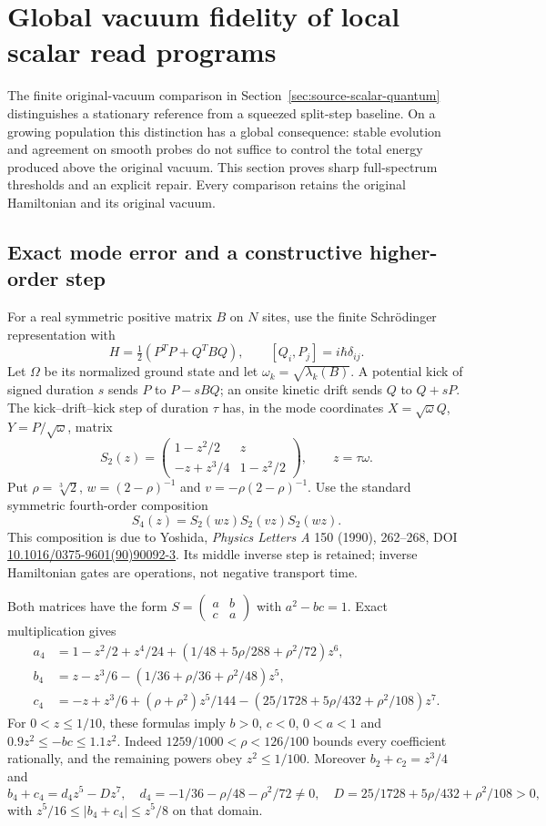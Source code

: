\section{Global vacuum fidelity of local scalar read programs}
\label{sec:m1-vacuum-fidelity}

The finite original-vacuum comparison in
Section~\ref{sec:source-scalar-quantum} distinguishes a stationary reference
from a squeezed split-step baseline. On a growing population this distinction
has a global consequence: stable evolution and agreement on smooth probes do
not suffice to control the total energy produced above the original vacuum.
This section proves sharp full-spectrum thresholds and an explicit repair.
Every comparison retains the original Hamiltonian and its original vacuum.

\subsection{Exact mode error and a constructive higher-order step}

For a real symmetric positive matrix $B$ on $N$ sites, use the finite
Schr\"odinger representation with
\[
 H=\tfrac12(P^TP+Q^TBQ),\qquad [Q_i,P_j]=i\hbar\delta_{ij}.
\]
Let $\Omega$ be its normalized ground state and let
$\omega_k=\sqrt{\lambda_k(B)}$. A potential kick of signed duration $s$
sends $P$ to $P-sBQ$; an onsite kinetic drift sends $Q$ to $Q+sP$.
The kick--drift--kick step of duration $\tau$ has, in the mode coordinates
$X=\sqrt\omega Q$, $Y=P/\sqrt\omega$, matrix
\[
 S_2(z)=\begin{pmatrix}1-z^2/2&z\\-z+z^3/4&1-z^2/2\end{pmatrix},
 \qquad z=\tau\omega.
\]
Put $\rho=\sqrt[3]{2}$, $w=(2-\rho)^{-1}$ and $v=-\rho(2-\rho)^{-1}$. Use the
standard symmetric fourth-order composition
\[
 S_4(z)=S_2(wz)S_2(vz)S_2(wz).
\]
This composition is due to Yoshida, \emph{Physics Letters A} 150 (1990),
262--268, DOI \href{https://doi.org/10.1016/0375-9601(90)90092-3}
{10.1016/0375-9601(90)90092-3}. Its middle inverse step is retained;
inverse Hamiltonian gates are operations, not negative transport time.

Both matrices have the form $S=\left(\begin{smallmatrix}a&b\\c&a\end{smallmatrix}\right)$
with $a^2-bc=1$. Exact multiplication gives
\begin{align*}
 a_4&=1-z^2/2+z^4/24+(1/48+5\rho/288+\rho^2/72)z^6,\\
 b_4&=z-z^3/6-(1/36+\rho/36+\rho^2/48)z^5,\\
 c_4&=-z+z^3/6+(\rho+\rho^2)z^5/144
             -(25/1728+5\rho/432+\rho^2/108)z^7.
\end{align*}
For $0<z\le1/10$, these formulas imply $b>0$, $c<0$, $0<a<1$ and
$0.9z^2\le-bc\le1.1z^2$. Indeed $1259/1000<\rho<126/100$ bounds every
coefficient rationally, and the remaining powers obey $z^2\le1/100$.
Moreover $b_2+c_2=z^3/4$ and
\[
 b_4+c_4=d_4z^5-Dz^7,\quad
 d_4=-1/36-\rho/48-\rho^2/72\ne0,\quad
 D=25/1728+5\rho/432+\rho^2/108>0,
\]
with $z^5/16\le|b_4+c_4|\le z^5/8$ on that domain.

